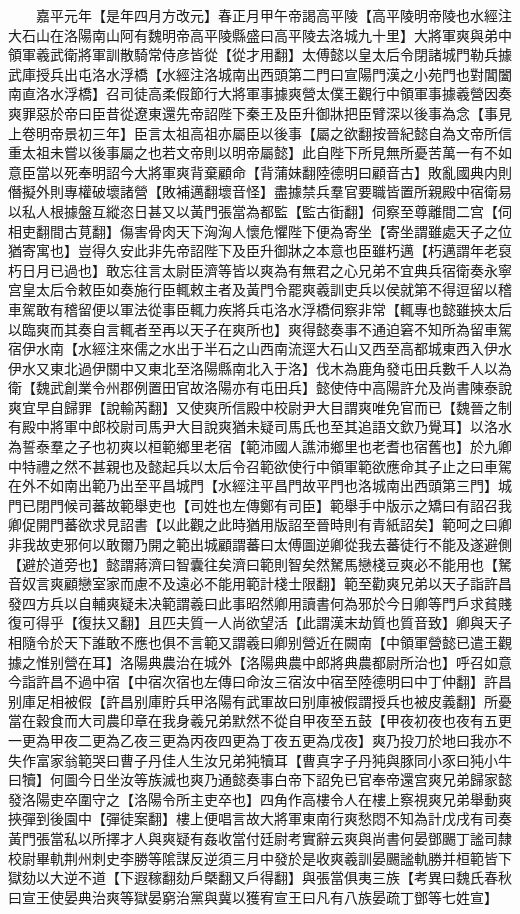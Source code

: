 　　嘉平元年【是年四月方改元】春正月甲午帝謁高平陵【高平陵明帝陵也水經注大石山在洛陽南山阿有魏明帝高平陵縣盛曰高平陵去洛城九十里】大將軍爽與弟中領軍羲武衛將軍訓散騎常侍彦皆從【從才用翻】太傅懿以皇太后令閉諸城門勒兵據武庫授兵出屯洛水浮橋【水經注洛城南出西頭第二門曰宣陽門漢之小苑門也對閶闔南直洛水浮橋】召司徒高柔假節行大將軍事據爽營太僕王觀行中領軍事據羲營因奏爽罪惡於帝曰臣昔從遼東還先帝詔陛下秦王及臣升御牀把臣臂深以後事為念【事見上卷明帝景初三年】臣言太祖高祖亦屬臣以後事【屬之欲翻按晉紀懿自為文帝所信重太祖未嘗以後事屬之也若文帝則以明帝屬懿】此自陛下所見無所憂苦萬一有不如意臣當以死奉明詔今大將軍爽背棄顧命【背蒲妹翻陸德明曰顧音古】敗亂國典内則僭擬外則專權破壞諸營【敗補邁翻壞音怪】盡據禁兵羣官要職皆置所親殿中宿衛易以私人根據盤互縱恣日甚又以黃門張當為都監【監古衘翻】伺察至尊離間二宫【伺相吏翻間古莧翻】傷害骨肉天下洶洶人懷危懼陛下便為寄坐【寄坐謂雖處天子之位猶寄寓也】豈得久安此非先帝詔陛下及臣升御牀之本意也臣雖朽邁【朽邁謂年老裒朽日月已過也】敢忘往言太尉臣濟等皆以爽為有無君之心兄弟不宜典兵宿衛奏永寧宫皇太后令敕臣如奏施行臣輒敕主者及黃門令罷爽羲訓吏兵以侯就第不得逗留以稽車駕敢有稽留便以軍法從事臣輒力疾將兵屯洛水浮橋伺察非常【輒專也懿雖挾太后以臨爽而其奏自言輒者至再以天子在爽所也】爽得懿奏事不通迫窘不知所為留車駕宿伊水南【水經注來儒之水出于半石之山西南流逕大石山又西至高都城東西入伊水伊水又東北過伊關中又東北至洛陽縣南北入于洛】伐木為鹿角發屯田兵數千人以為衛【魏武創業令州郡例置田官故洛陽亦有屯田兵】懿使侍中高陽許允及尚書陳泰說爽宜早自歸罪【說輸芮翻】又使爽所信殿中校尉尹大目謂爽唯免官而已【魏晉之制有殿中將軍中郎校尉司馬尹大目說爽猶未疑司馬氏也至其追語文欽乃覺耳】以洛水為誓泰羣之子也初爽以桓範鄉里老宿【範沛國人譙沛鄉里也老耆也宿舊也】於九卿中特禮之然不甚親也及懿起兵以太后令召範欲使行中領軍範欲應命其子止之曰車駕在外不如南出範乃出至平昌城門【水經注平昌門故平門也洛城南出西頭第三門】城門已閉門候司蕃故範舉吏也【司姓也左傳鄭有司臣】範舉手中版示之矯曰有詔召我卿促開門蕃欲求見詔書【以此觀之此時猶用版詔至晉時則有青紙詔矣】範呵之曰卿非我故吏邪何以敢爾乃開之範出城顧謂蕃曰太傅圖逆卿從我去蕃徒行不能及遂避側【避於道旁也】懿謂蔣濟曰智囊往矣濟曰範則智矣然駑馬戀棧豆爽必不能用也【駑音奴言爽顧戀室家而慮不及遠必不能用範計棧士限翻】範至勸爽兄弟以天子詣許昌發四方兵以自輔爽疑未决範謂羲曰此事昭然卿用讀書何為邪於今日卿等門戶求貧賤復可得乎【復扶又翻】且匹夫質一人尚欲望活【此謂漢末劫質也質音致】卿與天子相隨令於天下誰敢不應也俱不言範又謂羲曰卿别營近在闕南【中領軍營懿已遣王觀據之惟别營在耳】洛陽典農治在城外【洛陽典農中郎將典農都尉所治也】呼召如意今詣許昌不過中宿【中宿次宿也左傳曰命汝三宿汝中宿至陸德明曰中丁仲翻】許昌别庫足相被假【許昌别庫貯兵甲洛陽有武軍故曰别庫被假謂授兵也被皮義翻】所憂當在穀食而大司農印章在我身羲兄弟默然不從自甲夜至五鼓【甲夜初夜也夜有五更一更為甲夜二更為乙夜三更為丙夜四更為丁夜五更為戊夜】爽乃投刀於地曰我亦不失作富家翁範哭曰曹子丹佳人生汝兄弟㹠犢耳【曹真字子丹㹠與豚同小豕曰㹠小牛曰犢】何圖今日坐汝等族滅也爽乃通懿奏事白帝下詔免已官奉帝還宫爽兄弟歸家懿發洛陽吏卒圍守之【洛陽令所主吏卒也】四角作高樓令人在樓上察視爽兄弟舉動爽挾彈到後園中【彈徒案翻】樓上便唱言故大將軍東南行爽愁悶不知為計戊戌有司奏黃門張當私以所擇才人與爽疑有姦收當付廷尉考實辭云爽與尚書何晏鄧颺丁謐司隸校尉畢軌荆州刺史李勝等隂謀反逆須三月中發於是收爽羲訓晏颺謐軌勝并桓範皆下獄劾以大逆不道【下遐稼翻劾戶槩翻又戶得翻】與張當俱夷三族【考異曰魏氏春秋曰宣王使晏典治爽等獄晏窮治黨與冀以獲宥宣王曰凡有八族晏疏丁鄧等七姓宣】

